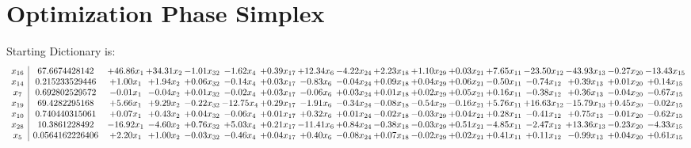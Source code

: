 \documentclass[9pt]{article}
\begin{document}
\section{Optimization Phase Simplex}
Starting Dictionary is:
\[\begin{array}{c| c c@{\hskip 2pt} c@{\hskip 2pt} c@{\hskip 2pt} c@{\hskip 2pt} c@{\hskip 2pt} c@{\hskip 2pt} c@{\hskip 2pt} c@{\hskip 2pt} c@{\hskip 2pt} c@{\hskip 2pt} c@{\hskip 2pt} c@{\hskip 2pt} c@{\hskip 2pt} c@{\hskip 2pt} c@{\hskip 2pt} }
 x_{16}   &  67.6674428142 & + 46.86 x_{1} & + 34.31 x_{2} & -1.01 x_{32} & -1.62 x_{4} & +  0.39 x_{17} & + 12.34 x_{6} & -4.22 x_{24} & +  2.23 x_{18} & +  1.10 x_{29} & +  0.03 x_{21} & +  7.65 x_{11} & -23.50 x_{12} & -43.93 x_{13} & -0.27 x_{20} & -13.43 x_{15}\\
 x_{14}   &  0.215233529446 & +  1.00 x_{1} & +  1.94 x_{2} & +  0.06 x_{32} & -0.14 x_{4} & +  0.03 x_{17} & -0.83 x_{6} & -0.04 x_{24} & +  0.09 x_{18} & +  0.04 x_{29} & +  0.06 x_{21} & -0.50 x_{11} & -0.74 x_{12} & +  0.39 x_{13} & +  0.01 x_{20} & +  0.14 x_{15}\\
 x_{7}   &  0.692802529572 & -0.01 x_{1} & -0.04 x_{2} & +  0.01 x_{32} & -0.02 x_{4} & +  0.03 x_{17} & -0.06 x_{6} & +  0.03 x_{24} & +  0.01 x_{18} & +  0.02 x_{29} & +  0.05 x_{21} & +  0.16 x_{11} & -0.38 x_{12} & +  0.36 x_{13} & -0.04 x_{20} & -0.67 x_{15}\\
 x_{19}   &  69.4282295168 & +  5.66 x_{1} & +  9.29 x_{2} & -0.22 x_{32} & -12.75 x_{4} & +  0.29 x_{17} & -1.91 x_{6} & -0.34 x_{24} & -0.08 x_{18} & -0.54 x_{29} & -0.16 x_{21} & +  5.76 x_{11} & + 16.63 x_{12} & -15.79 x_{13} & +  0.45 x_{20} & -0.02 x_{15}\\
 x_{10}   &  0.740440315061 & +  0.07 x_{1} & +  0.43 x_{2} & +  0.04 x_{32} & -0.06 x_{4} & +  0.01 x_{17} & +  0.32 x_{6} & +  0.01 x_{24} & -0.02 x_{18} & -0.03 x_{29} & +  0.04 x_{21} & +  0.28 x_{11} & -0.41 x_{12} & +  0.75 x_{13} & -0.01 x_{20} & -0.62 x_{15}\\
 x_{28}   &  10.3861228492 & -16.92 x_{1} & -4.60 x_{2} & +  0.76 x_{32} & +  5.03 x_{4} & +  0.21 x_{17} & -11.41 x_{6} & +  0.84 x_{24} & -0.38 x_{18} & -0.03 x_{29} & +  0.51 x_{21} & -4.85 x_{11} & -2.47 x_{12} & + 13.36 x_{13} & -0.23 x_{20} & -4.33 x_{15}\\
 x_{5}   &  0.0564162226406 & +  2.20 x_{1} & +  1.00 x_{2} & -0.03 x_{32} & -0.46 x_{4} & +  0.04 x_{17} & +  0.40 x_{6} & -0.08 x_{24} & +  0.07 x_{18} & -0.02 x_{29} & +  0.02 x_{21} & +  0.41 x_{11} & +  0.11 x_{12} & -0.99 x_{13} & +  0.04 x_{20} & +  0.61 x_{15}\\

\end{array}\]
\end{document}

